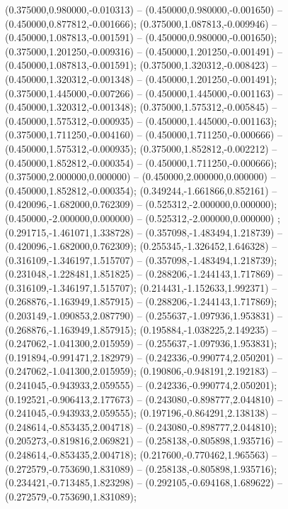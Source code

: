  (0.375000,0.980000,-0.010313) -- (0.450000,0.980000,-0.001650) -- (0.450000,0.877812,-0.001666);
 (0.375000,1.087813,-0.009946) -- (0.450000,1.087813,-0.001591) -- (0.450000,0.980000,-0.001650);
 (0.375000,1.201250,-0.009316) -- (0.450000,1.201250,-0.001491) -- (0.450000,1.087813,-0.001591);
 (0.375000,1.320312,-0.008423) -- (0.450000,1.320312,-0.001348) -- (0.450000,1.201250,-0.001491);
 (0.375000,1.445000,-0.007266) -- (0.450000,1.445000,-0.001163) -- (0.450000,1.320312,-0.001348);
 (0.375000,1.575312,-0.005845) -- (0.450000,1.575312,-0.000935) -- (0.450000,1.445000,-0.001163);
 (0.375000,1.711250,-0.004160) -- (0.450000,1.711250,-0.000666) -- (0.450000,1.575312,-0.000935);
 (0.375000,1.852812,-0.002212) -- (0.450000,1.852812,-0.000354) -- (0.450000,1.711250,-0.000666);
 (0.375000,2.000000,0.000000) -- (0.450000,2.000000,0.000000) -- (0.450000,1.852812,-0.000354);
 (0.349244,-1.661866,0.852161) -- (0.420096,-1.682000,0.762309) -- (0.525312,-2.000000,0.000000);
 (0.450000,-2.000000,0.000000) -- (0.525312,-2.000000,0.000000) ;
 (0.291715,-1.461071,1.338728) -- (0.357098,-1.483494,1.218739) -- (0.420096,-1.682000,0.762309);
 (0.255345,-1.326452,1.646328) -- (0.316109,-1.346197,1.515707) -- (0.357098,-1.483494,1.218739);
 (0.231048,-1.228481,1.851825) -- (0.288206,-1.244143,1.717869) -- (0.316109,-1.346197,1.515707);
 (0.214431,-1.152633,1.992371) -- (0.268876,-1.163949,1.857915) -- (0.288206,-1.244143,1.717869);
 (0.203149,-1.090853,2.087790) -- (0.255637,-1.097936,1.953831) -- (0.268876,-1.163949,1.857915);
 (0.195884,-1.038225,2.149235) -- (0.247062,-1.041300,2.015959) -- (0.255637,-1.097936,1.953831);
 (0.191894,-0.991471,2.182979) -- (0.242336,-0.990774,2.050201) -- (0.247062,-1.041300,2.015959);
 (0.190806,-0.948191,2.192183) -- (0.241045,-0.943933,2.059555) -- (0.242336,-0.990774,2.050201);
 (0.192521,-0.906413,2.177673) -- (0.243080,-0.898777,2.044810) -- (0.241045,-0.943933,2.059555);
 (0.197196,-0.864291,2.138138) -- (0.248614,-0.853435,2.004718) -- (0.243080,-0.898777,2.044810);
 (0.205273,-0.819816,2.069821) -- (0.258138,-0.805898,1.935716) -- (0.248614,-0.853435,2.004718);
 (0.217600,-0.770462,1.965563) -- (0.272579,-0.753690,1.831089) -- (0.258138,-0.805898,1.935716);
 (0.234421,-0.713485,1.823298) -- (0.292105,-0.694168,1.689622) -- (0.272579,-0.753690,1.831089);
